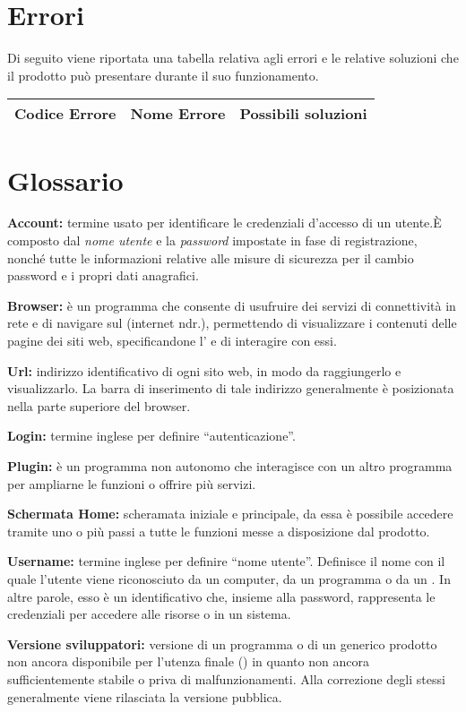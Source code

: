 \section{Errori}
Di seguito viene riportata una tabella relativa agli errori e le relative soluzioni che il prodotto \caName{} può presentare durante il suo funzionamento.

\begin{center}
\begin{longtable}{llp{}}
\toprule Codice Errore & Nome Errore  & Possibili soluzioni\\
\midrule
\bottomrule
\end{longtable}
\end{center}

\section{Glossario}
\begin{description}
\item\textbf{Account:} termine usato per identificare le credenziali d'accesso di un utente.È composto dal \textit{nome utente} e la \textit{password} impostate in fase di registrazione, nonché tutte le informazioni relative alle misure di sicurezza per il cambio password e i propri dati anagrafici.
\item\textbf{Browser:} è un programma che consente di usufruire dei servizi di connettività in rete e di navigare sul  (internet ndr.), permettendo di visualizzare i contenuti delle pagine dei siti web, specificandone l' e di interagire con essi.
\item\textbf{Url:} indirizzo identificativo di ogni sito web, in modo da raggiungerlo e visualizzarlo. La barra di inserimento di tale indirizzo generalmente è posizionata nella parte superiore del browser.
\item\textbf{Login:} termine inglese per definire ``autenticazione''.
\item\textbf{Plugin:} è un programma non autonomo che interagisce con un altro programma per ampliarne le funzioni o offrire più servizi.
\item\textbf{Schermata Home:} scheramata iniziale e principale, da essa è possibile accedere tramite uno o più passi a tutte le funzioni messe a disposizione dal prodotto.
\item\textbf{Username:} termine inglese per definire ``nome utente''. Definisce il nome con il quale l'utente viene riconosciuto da un computer, da un programma o da un . In altre parole, esso è un identificativo che, insieme alla password, rappresenta le credenziali per accedere alle risorse o in un sistema.
\item\textbf{Versione sviluppatori:} versione di un programma o di un generico prodotto non ancora disponibile per l'utenza finale () in quanto non ancora sufficientemente  stabile o priva di malfunzionamenti. Alla correzione degli stessi generalmente viene rilasciata la versione pubblica.
\end{description}


